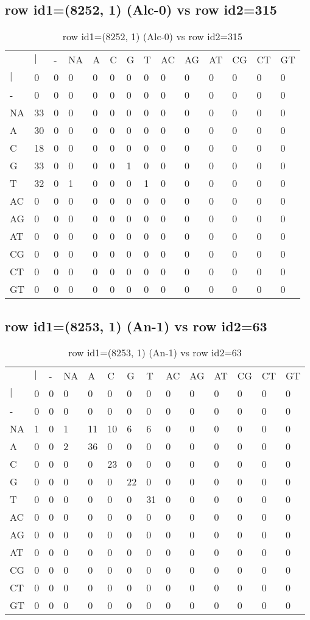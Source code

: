 \subsection{row id1=(8252, 1) (Alc-0) vs row id2=315}
\begin{center}
\begin{longtable}{|l|l|l|l|l|l|l|l|l|l|l|l|l|l|}
\caption{row id1=(8252, 1) (Alc-0) vs row id2=315} \label{table_dm392}\\
\hline
\\
\hline
&$|$&-&NA&A&C&G&T&AC&AG&AT&CG&CT&GT\\
$|$&0&0&0&0&0&0&0&0&0&0&0&0&0\\
-&0&0&0&0&0&0&0&0&0&0&0&0&0\\
NA&33&0&0&0&0&0&0&0&0&0&0&0&0\\
A&30&0&0&0&0&0&0&0&0&0&0&0&0\\
C&18&0&0&0&0&0&0&0&0&0&0&0&0\\
G&33&0&0&0&0&1&0&0&0&0&0&0&0\\
T&32&0&1&0&0&0&1&0&0&0&0&0&0\\
AC&0&0&0&0&0&0&0&0&0&0&0&0&0\\
AG&0&0&0&0&0&0&0&0&0&0&0&0&0\\
AT&0&0&0&0&0&0&0&0&0&0&0&0&0\\
CG&0&0&0&0&0&0&0&0&0&0&0&0&0\\
CT&0&0&0&0&0&0&0&0&0&0&0&0&0\\
GT&0&0&0&0&0&0&0&0&0&0&0&0&0\\
\hline
\end{longtable}
\end{center}

\subsection{row id1=(8253, 1) (An-1) vs row id2=63}
\begin{center}
\begin{longtable}{|l|l|l|l|l|l|l|l|l|l|l|l|l|l|}
\caption{row id1=(8253, 1) (An-1) vs row id2=63} \label{table_dm394}\\
\hline
\\
\hline
&$|$&-&NA&A&C&G&T&AC&AG&AT&CG&CT&GT\\
$|$&0&0&0&0&0&0&0&0&0&0&0&0&0\\
-&0&0&0&0&0&0&0&0&0&0&0&0&0\\
NA&1&0&1&11&10&6&6&0&0&0&0&0&0\\
A&0&0&2&36&0&0&0&0&0&0&0&0&0\\
C&0&0&0&0&23&0&0&0&0&0&0&0&0\\
G&0&0&0&0&0&22&0&0&0&0&0&0&0\\
T&0&0&0&0&0&0&31&0&0&0&0&0&0\\
AC&0&0&0&0&0&0&0&0&0&0&0&0&0\\
AG&0&0&0&0&0&0&0&0&0&0&0&0&0\\
AT&0&0&0&0&0&0&0&0&0&0&0&0&0\\
CG&0&0&0&0&0&0&0&0&0&0&0&0&0\\
CT&0&0&0&0&0&0&0&0&0&0&0&0&0\\
GT&0&0&0&0&0&0&0&0&0&0&0&0&0\\
\hline
\end{longtable}
\end{center}

